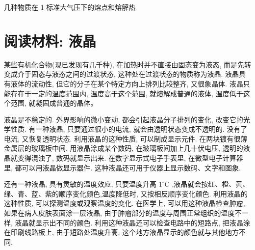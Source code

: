 \documentclass[10pt]{article}
\begin{document}
几种物质在 1 标准大气压下的熔点和熔解热

\begin{center}
\end{center}

\section*{阅读材料: 液晶}

某些有机化合物(现已发现有几千种), 在加热时并不直接由固态变为液态, 而是先转变成介于固态与液态之间的过渡状态, 这种处在过渡状态的物质称为液晶. 液晶具有液体的流动性, 但它的分子在某个特定方向上排列比较整齐, 又很象晶体. 液晶只能存在于一定的温度范围内, 温度高于这个范围, 就熔解成普通的液体, 温度低于这个范围, 就凝固成普通的晶体。

液晶是不稳定的. 外界影响的微小变动, 都会引起液晶分子排列的变化, 改变它的光学性质. 有一种液晶, 只要通过很小的电流, 就会由透明状态变成不透明的. 没有了电流, 又恢复透明状态. 利用液晶的这种性质, 可以制成显示元件. 在两块镀有很薄金属层的玻璃板中间, 用液晶涂成某个数码, 在玻璃板间加上几十伏电压, 透明的液晶就变得混浊了, 数码就显示出来. 在数字显示式电子手表里, 在微型电子计算器里, 都可以用液晶做显示器件. 这种液晶还可用于仪器上显示数码、文字和图象.

还有一种液晶, 具有灵敏的温度效应, 只要温度升高 \({1}^{ \circ }\mathrm{C}\) ,液晶就会按红、橙、黄、绿、青、蓝、紫的顺序变化颜色,温度降低时, 又按相反顺序变化颜色. 利用液晶的这种性质, 可以探测温度或观察温度的变化. 在医学上, 可以用这种液晶检查肿瘤, 如果在病人皮肤表面涂一层液晶, 由于肿瘤部分的温度与周围正常组织的温度不一样, 液晶就显示出不同的颜色. 利用这种液晶还可以检查电路中的短路点, 把液晶涂在印刷线路板上, 由于短路处温度升高, 这个地方液晶显示的颜色就与其他地方不同.
\end{document}
